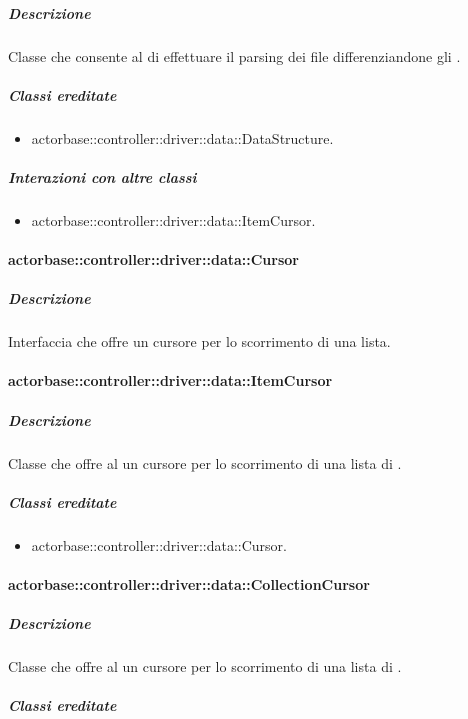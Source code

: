 \documentclass{scalatekids-article}
\begin{document}
\subparagraph{Descrizione}

Classe che consente al  di effettuare il parsing dei file
 differenziandone gli .

\subparagraph{Classi ereditate}

\begin{itemize}
\item actorbase::controller::driver::data::DataStructure.
\end{itemize}

\subparagraph{Interazioni con altre classi}

\begin{itemize}
\item actorbase::controller::driver::data::ItemCursor.
\end{itemize}

\paragraph{actorbase::controller::driver::data::Cursor}

\subparagraph{Descrizione}

Interfaccia che offre un cursore per lo scorrimento di una lista.

\paragraph{actorbase::controller::driver::data::ItemCursor}

\subparagraph{Descrizione}

Classe che offre al  un cursore per lo scorrimento di una lista
di .

\subparagraph{Classi ereditate}

\begin{itemize}
\item actorbase::controller::driver::data::Cursor.
\end{itemize}

\paragraph{actorbase::controller::driver::data::CollectionCursor}

\subparagraph{Descrizione}

Classe che offre al  un cursore per lo scorrimento di una lista di
.

\subparagraph{Classi ereditate}
\end{document}
